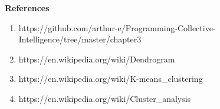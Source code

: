 \documentclass{article}
\begin{document}
\textbf{References}
\begin{enumerate}
\item\textbf{} https://github.com/arthur-e/Programming-Collective-Intelligence/tree/master/chapter3
\item\textbf{} https://en.wikipedia.org/wiki/Dendrogram
\item\textbf{} https://en.wikipedia.org/wiki/K-means_clustering
\item\textbf{} https://en.wikipedia.org/wiki/Cluster_analysis
\end{enumerate}
\end{document}
